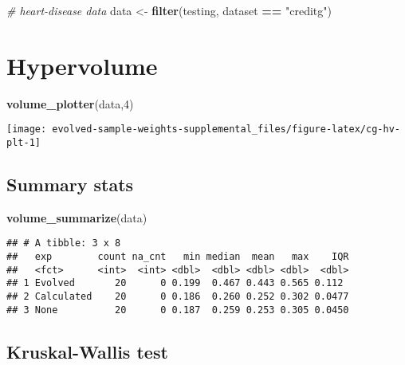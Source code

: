\documentclass[
]{book}
\newenvironment{Shaded}{\begin{snugshade}}{\end{snugshade}}
\newcommand{\CommentTok}[1]{\textcolor[rgb]{0.56,0.35,0.01}{\textit{#1}}}
\newcommand{\DecValTok}[1]{\textcolor[rgb]{0.00,0.00,0.81}{#1}}
\newcommand{\FunctionTok}[1]{\textcolor[rgb]{0.13,0.29,0.53}{\textbf{#1}}}
\newcommand{\NormalTok}[1]{#1}
\newcommand{\OtherTok}[1]{\textcolor[rgb]{0.56,0.35,0.01}{#1}}
\newcommand{\SpecialCharTok}[1]{\textcolor[rgb]{0.81,0.36,0.00}{\textbf{#1}}}
\newcommand{\StringTok}[1]{\textcolor[rgb]{0.31,0.60,0.02}{#1}}
\begin{document}
\begin{Shaded}
\begin{Highlighting}[]
\CommentTok{\# heart{-}disease data}
\NormalTok{data }\OtherTok{\textless{}{-}} \FunctionTok{filter}\NormalTok{(testing, dataset }\SpecialCharTok{==} \StringTok{"creditg"}\NormalTok{)}
\end{Highlighting}
\end{Shaded}

\hypertarget{hypervolume-3}{%
\section{Hypervolume}\label{hypervolume-3}}

\begin{Shaded}
\begin{Highlighting}[]
\FunctionTok{volume\_plotter}\NormalTok{(data,}\DecValTok{4}\NormalTok{)}
\end{Highlighting}
\end{Shaded}

\texttt{[image: evolved-sample-weights-supplemental\_files/figure-latex/cg-hv-plt-1]}

\hypertarget{summary-stats-3}{%
\subsection{Summary stats}\label{summary-stats-3}}

\begin{Shaded}
\begin{Highlighting}[]
\FunctionTok{volume\_summarize}\NormalTok{(data)}
\end{Highlighting}
\end{Shaded}

\begin{verbatim}
## # A tibble: 3 x 8
##   exp        count na_cnt   min median  mean   max    IQR
##   <fct>      <int>  <int> <dbl>  <dbl> <dbl> <dbl>  <dbl>
## 1 Evolved       20      0 0.199  0.467 0.443 0.565 0.112 
## 2 Calculated    20      0 0.186  0.260 0.252 0.302 0.0477
## 3 None          20      0 0.187  0.259 0.253 0.305 0.0450
\end{verbatim}

\hypertarget{kruskal-wallis-test-3}{%
\subsection{Kruskal-Wallis test}\label{kruskal-wallis-test-3}}
\end{document}
